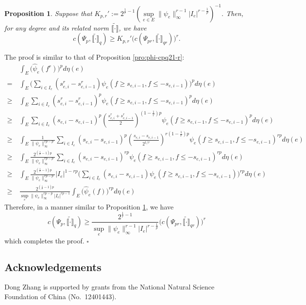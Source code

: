 \documentclass[12pt,a4paper]{article}
\newtheorem{prop}[theorem]{Proposition}
\newenvironment{proof}{\medskip\noindent{\bf Proof. }}{\hfill$\square$\medskip}
\begin{document}
\begin{prop}\label{pro:psi-cpq21-r}
Suppose that $K_{p,r}':=2^{\frac1r-1}(\sup\limits_{e\in E}\|\psi_e\|_\infty^{r-1}|I_e|^{r-\frac1p})^{-1}$. Then, for any degree and its related norm $\widetilde{\llbracket \cdot\rrbracket}$, we have
$$c(\Psi_p,\widetilde{\llbracket \cdot\rrbracket}_{q})\ge  K_{p,r}'\big(c(\Psi_{pr},\widetilde{\llbracket \cdot\rrbracket}_{qr})\big)^r.$$ 
\end{prop}

\begin{proof}
The proof is similar to that of Proposition \ref{pro:phi-cpq21-r}:
\begin{align*}
&\int_E\big(\widehat{\psi}_e(f^r)\big)^pd\eta(e)
\\ =~
&\int_E\Big(\sum_{i\in I_e} (s_{e,i}^r-s_{e,i-1}^r)\psi_e(f\ge s_{e,i-1},f\le -s_{e,i-1})\Big)^pd\eta(e)
\\ \ge~& \int_E \sum_{i\in I_e} (s_{e,i}^r-s_{e,i-1}^r)^p\psi_e(f\ge s_{e,i-1},f\le -s_{e,i-1}) ^pd\eta(e)
\\ \ge~&\int_E\sum_{i\in I_e} (s_{e,i}-s_{e,i-1})^p\left(\frac{s_{e,i}^r+s_{e,i-1}^r}{2}\right)^{(1-\frac1r)p}\psi_e(f\ge s_{e,i-1},f\le -s_{e,i-1})^pd\eta(e)
\\ \ge~&\int_E\frac{1}{ \|\psi_e\|_\infty^{rp-p}}\sum_{i\in I_e} (s_{e,i}-s_{e,i-1})^p\left(\frac{s_{e,i}-s_{e,i-1}}{2^{1/r}}\right)^{r(1-\frac1r)p}\psi_e(f\ge s_{e,i-1},f\le -s_{e,i-1})^{rp}d\eta(e)
\\ \ge~&\int_E\frac{2^{(\frac1r-1)p}}{ \|\psi_e\|_\infty^{rp-p}}\sum_{i\in I_e} (s_{e,i}-s_{e,i-1})^{rp}\psi_e(f\ge s_{e,i-1},f\le -s_{e,i-1})^{rp}d\eta(e)
\\ \ge~&\int_E \frac{2^{(\frac1r-1)p}}{ \|\psi_e\|_\infty^{rp-p}}|I_e|^{1-rp}\Big(\sum_{i\in I_e} (s_{e,i}-s_{e,i-1})\psi_e(f\ge s_{e,i-1},f\le -s_{e,i-1})\Big)^{rp}d\eta(e)
\\ \ge~&\frac{2^{(\frac1r-1)p}}{\sup_e\|\psi_e\|_\infty^{rp-p}|I_e|^{rp-1}}\int_E \big(\widehat{\psi}_e(f)\big)^{rp}d\eta(e)
\end{align*}
Therefore, in a manner similar to Proposition \ref{pro:psi-cpq21-r}, we have $$c(\Psi_p,\widetilde{\llbracket \cdot\rrbracket}_{q})\ge  \frac{2^{\frac1r-1}}{\sup\limits_e\|\psi_e\|_\infty^{r-1}|I_e|^{r-\frac1p}}\big(c(\Psi_{pr},\widetilde{\llbracket \cdot\rrbracket}_{qr})\big)^r$$
which completes the proof.
\end{proof}


\subsection*{Acknowledgements}
Dong Zhang is supported by grants from  the  National Natural Science Foundation of China (No.\ 12401443). 


{\footnotesize
 
}
 
\end{document}
